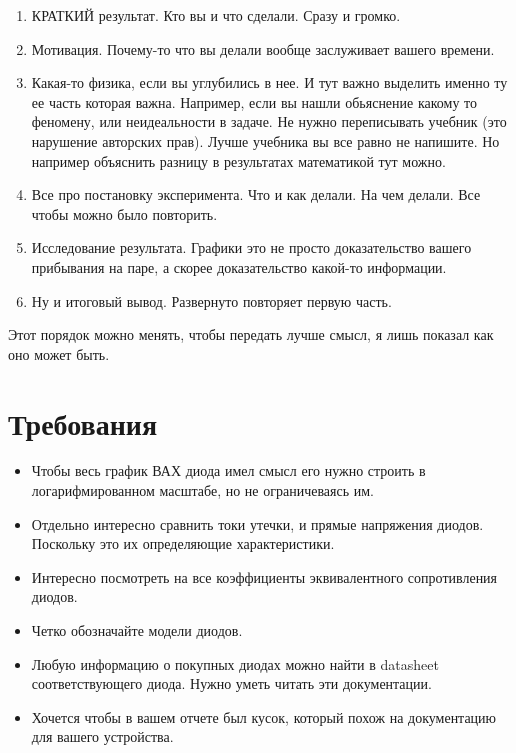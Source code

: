 \documentclass[a4paper,12pt]{article} %
\begin{document}
\begin{enumerate}
  \item КРАТКИЙ результат. Кто вы и что сделали. Сразу и громко.
  \item Мотивация. Почему-то что вы делали вообще заслуживает вашего времени.
  \item Какая-то физика, если вы углубились в нее. И тут важно выделить именно ту ее часть которая важна. Например, если вы нашли обьяснение какому то феномену, или неидеальности в задаче. Не нужно переписывать учебник (это нарушение авторских прав). Лучше учебника вы все равно не напишите. Но например объяснить разницу в результатах математикой тут можно.
  \item Все про постановку эксперимента. Что и как делали. На чем делали. Все чтобы можно было повторить.
  \item Исследование результата. Графики это не просто доказательство вашего прибывания на паре, а скорее доказательство какой-то информации.
  \item Ну и итоговый вывод. Развернуто повторяет первую часть.
\end{enumerate}
Этот порядок можно менять, чтобы передать лучше смысл, я лишь показал как оно может быть.

\section{Требования}
\begin{itemize}
  \item Чтобы весь график ВАХ диода имел смысл его нужно строить в логарифмированном масштабе, но не ограничеваясь им.
  \item Отдельно интересно сравнить токи утечки, и прямые напряжения диодов. Поскольку это их определяющие характеристики.
  \item Интересно посмотреть на все коэффициенты эквивалентного сопротивления диодов.
  \item Четко обозначайте модели диодов.
  \item Любую информацию о покупных диодах можно найти в datasheet соответствующего диода. Нужно уметь читать эти документации.
  \item Хочется чтобы в вашем отчете был кусок, который похож на документацию для вашего устройства.
\end{itemize}
\end{document}
